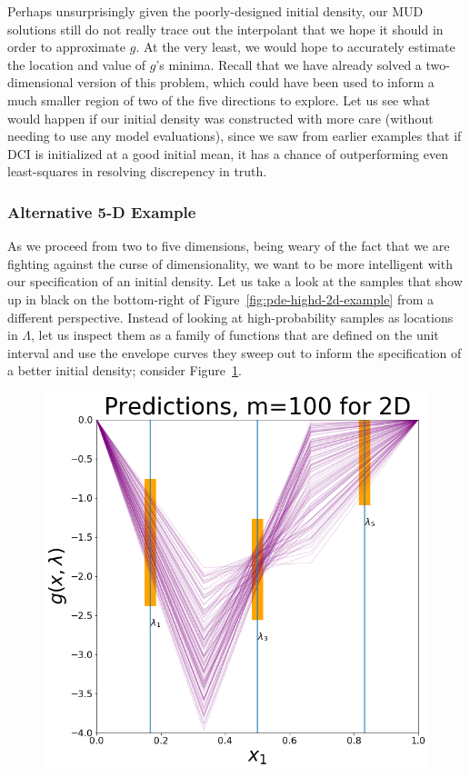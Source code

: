 Perhaps unsurprisingly given the poorly-designed initial density, our MUD solutions still do not really trace out the interpolant that we hope it should in order to approximate $g$.
At the very least, we would hope to accurately estimate the location and value of $g$'s minima.
Recall that we have already solved a two-dimensional version of this problem, which could have been used to inform a much smaller region of two of the five directions to explore.
Let us see what would happen if our initial density was constructed with more care (without needing to use any model evaluations), since we saw from earlier examples that if DCI is initialized at a good initial mean, it has a chance of outperforming even least-squares in resolving discrepency in truth.


\subsubsection{Alternative 5-D Example}

As we proceed from two to five dimensions, being weary of the fact that we are fighting against the curse of dimensionality, we want to be more intelligent with our specification of an initial density.
Let us take a look at the samples that show up in black on the bottom-right of Figure~\ref{fig:pde-highd-2d-example} from a different perspective.
Instead of looking at high-probability samples as locations in $\Lambda$, let us inspect them as a family of functions that are defined on the unit interval and use the envelope curves they sweep out to inform the specification of a better initial density; consider Figure~\ref{fig:pde-highd-5d-study}.

\begin{figure}[htbp]
\centering
  \includegraphics[width=0.675\linewidth]{figures/pde-highd/pde-highd-alt_initial_D5_m100.png}
\caption{
}
\label{fig:pde-highd-5d-study}
\end{figure}


